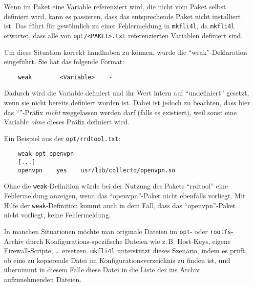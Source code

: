     Wenn im Paket eine Variable referenziert wird, die nicht vom Paket
    selbst definiert wird, kann es passieren, dass das entsprechende
    Paket nicht installiert ist. Das führt für gewöhnlich zu einer Fehlermeldung
    in \texttt{mkfli4l}, da \texttt{mkfli4l} erwartet, dass alle von \texttt{opt/<PAKET>.txt}
    referenzierten Variablen definiert sind.

    Um diese Situation korrekt handhaben zu können, wurde die
    "`weak"'-Deklaration eingeführt. Sie hat das folgende Format:

\begin{example}
\begin{verbatim}
    weak        <Variable>    -
\end{verbatim}
\end{example}

    Dadurch wird die Variable definiert und ihr Wert intern auf
    "`undefiniert"' gesetzt, wenn sie nicht bereits definiert worden ist. Dabei ist
    jedoch zu beachten, dass hier das "`"'-Präfix \emph{nicht} weggelassen
    werden darf (falls es existiert), weil sonst eine Variable \emph{ohne}
    dieses Präfix definiert wird.
    
    Ein Beispiel aus der \texttt{opt/rrdtool.txt}:
\begin{example}
\begin{verbatim}
    weak opt_openvpn -
    [...]
    openvpn    yes    usr/lib/collectd/openvpn.so
\end{verbatim}
\end{example}

    Ohne die \texttt{weak}-Definition würde  bei der Nutzung des
    Pakets "`rrdtool"' eine Fehlermeldung anzeigen, wenn das "`openvpn"'-Paket
    nicht ebenfalls vorliegt. Mit Hilfe der \texttt{weak}-Definition kommt auch
    in dem Fall, dass das "`openvpn"'-Paket nicht vorliegt, keine Fehlermeldung.


In manchen Situationen möchte man originale Dateien im \texttt{opt}- oder
\texttt{rootfs}-Archiv durch Konfigurations-spezifische Dateien 
wie z.\,B. Host-Keys, eigene Firewall-Scripte, \ldots{} ersetzen.
\texttt{mkfli4l} unterstützt dieses Szenario, indem es prüft, ob eine zu
kopierende Datei im Konfigurationsverzeichnis zu finden ist, und übernimmt in
diesem Falle diese Datei in die Liste der ins Archiv aufzunehmenden
Dateien.

